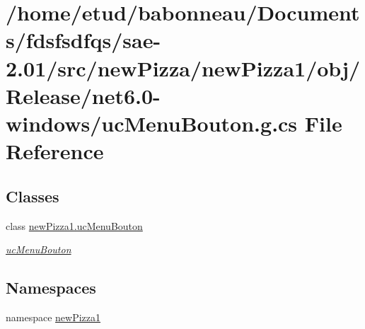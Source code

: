 \hypertarget{Release_2net6_80-windows_2ucMenuBouton_8g_8cs}{}\section{/home/etud/babonneau/\+Documents/fdsfsdfqs/sae-\/2.01/src/new\+Pizza/new\+Pizza1/obj/\+Release/net6.0-\/windows/uc\+Menu\+Bouton.g.\+cs File Reference}
\label{Release_2net6_80-windows_2ucMenuBouton_8g_8cs}
\subsection*{Classes}
\begin{DoxyCompactItemize}
\item 
class \hyperlink{classnewPizza1_1_1ucMenuBouton}{new\+Pizza1.\+uc\+Menu\+Bouton}
\begin{DoxyCompactList}\small\item\em \hyperlink{classnewPizza1_1_1ucMenuBouton}{uc\+Menu\+Bouton} \end{DoxyCompactList}\end{DoxyCompactItemize}
\subsection*{Namespaces}
\begin{DoxyCompactItemize}
\item 
namespace \hyperlink{namespacenewPizza1}{new\+Pizza1}
\end{DoxyCompactItemize}
